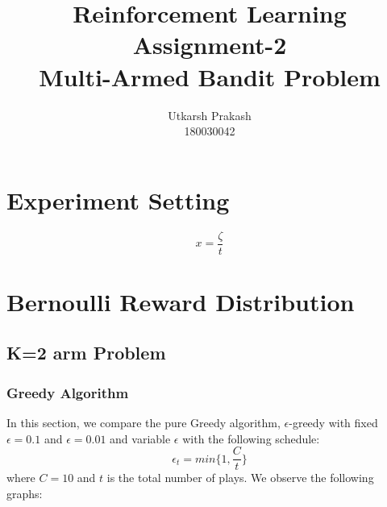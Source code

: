 \documentclass{article}
\title{Reinforcement Learning Assignment-2 \\
	\Large Multi-Armed Bandit Problem \\}
\begin{document}
\author{Utkarsh Prakash \\ \normalsize 180030042}
\maketitle
\section{Experiment Setting}
\begin{equation}
	x = \frac{\zeta}{t}
\label{default_schedule}
\end{equation}
\section{Bernoulli Reward Distribution}
	\subsection{K=2 arm Problem}
		\subsubsection{Greedy Algorithm}
		
		In this section, we compare the pure Greedy algorithm, $\epsilon$-greedy with fixed $\epsilon=0.1$ and $\epsilon=0.01$ and variable $\epsilon$ with the 
		following schedule:
		\begin{equation}
			\epsilon_{t} = min\{1, \frac{C}{t}\}
		\label{epsilon_greedy_schedule}
		\end{equation}
		where $C=10$ and $t$ is the total number of plays. We observe the following graphs:
		
\end{document}
